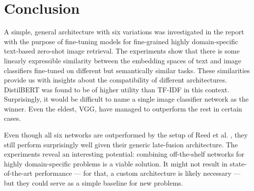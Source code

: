 \section{Conclusion}

A simple, general architecture with six variations was investigated in the report with the purpose of fine-tuning models for fine-grained highly domain-specific text-based zero-shot image retrieval. The experiments show that there is some linearly expressible similarity between the embedding spaces of text and image classifiers fine-tuned on different but semantically similar tasks. These similarities provide us with insights about the compatibility of different architectures. DistilBERT was found to be of higher utility than TF-IDF in this context. Surprisingly, it would be difficult to name a single image classifier network as the winner. Even the eldest, VGG, have managed to outperform the rest in certain cases. 

Even though all six networks are outperformed by the setup of Reed et al. \cite{reed2016learning}, they still perform surprisingly well given their generic late-fusion architecture. The experiments reveal an interesting potential: combining off-the-shelf networks for highly domain-specific problems is a viable solution. It might not result in state-of-the-art performance --- for that, a custom architecture is likely necessary --- but they could serve as a simple baseline for new problems.
